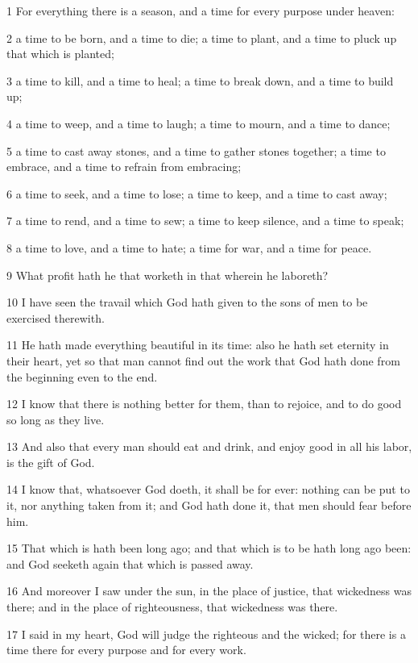 \par 1 For everything there is a season, and a time for every purpose under heaven:
\par 2 a time to be born, and a time to die; a time to plant, and a time to pluck up that which is planted;
\par 3 a time to kill, and a time to heal; a time to break down, and a time to build up;
\par 4 a time to weep, and a time to laugh; a time to mourn, and a time to dance;
\par 5 a time to cast away stones, and a time to gather stones together; a time to embrace, and a time to refrain from embracing;
\par 6 a time to seek, and a time to lose; a time to keep, and a time to cast away;
\par 7 a time to rend, and a time to sew; a time to keep silence, and a time to speak;
\par 8 a time to love, and a time to hate; a time for war, and a time for peace.
\par 9 What profit hath he that worketh in that wherein he laboreth?
\par 10 I have seen the travail which God hath given to the sons of men to be exercised therewith.
\par 11 He hath made everything beautiful in its time: also he hath set eternity in their heart, yet so that man cannot find out the work that God hath done from the beginning even to the end.
\par 12 I know that there is nothing better for them, than to rejoice, and to do good so long as they live.
\par 13 And also that every man should eat and drink, and enjoy good in all his labor, is the gift of God.
\par 14 I know that, whatsoever God doeth, it shall be for ever: nothing can be put to it, nor anything taken from it; and God hath done it, that men should fear before him.
\par 15 That which is hath been long ago; and that which is to be hath long ago been: and God seeketh again that which is passed away.
\par 16 And moreover I saw under the sun, in the place of justice, that wickedness was there; and in the place of righteousness, that wickedness was there.
\par 17 I said in my heart, God will judge the righteous and the wicked; for there is a time there for every purpose and for every work.
